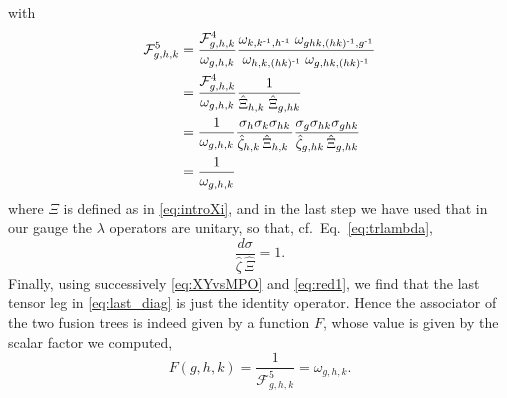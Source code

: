 \documentclass[reprint,
superscriptaddress,
amsmath,amssymb,
notitlepage,
aps,
prb,
10pt, 
tightenlines
]{revtex4-2}
\begin{document}
with
\begin{align}
    \mathcal{F}^5_{g,h,k}&=\frac{\mathcal{F}^4_{g,h,k}}{\omega_{g,h,k}}\frac{\omega_{k,k^{\text{-}1},h^{\text{-}1}}\;\omega_{ghk,(hk)^{\text{-}1},g^{\text{-}1}}}{\omega_{h,k,(hk)^{\text{-}1}}\;\omega_{g,hk,(hk)^{\text{-}1}}}\nonumber\\
    &=\frac{\mathcal{F}^4_{g,h,k}}{\omega_{g,h,k}}\dfrac{1}{\hat\Xi_{h,k}\;\hat\Xi_{g, hk}}\nonumber\\
    &=\frac{1}{\omega_{g,h,k}}\dfrac{\sigma_h\sigma_k\sigma_{hk}}{\hat\zeta_{h,k}\,\hat\Xi_{h,k}\;}\dfrac{\sigma_g\sigma_{hk}\sigma_{ghk}}{\hat\zeta_{g,hk}\,\hat\Xi_{g, hk}}\nonumber\\
    &=\frac{1}{\omega_{g,h,k}}
\end{align}
where $\Xi$ is defined as in \eqref{eq:introXi}, and in the last step we have used that in our gauge the $\lambda$ operators are unitary, so that, cf.~Eq.~\eqref{eq:trlambda},
\begin{equation}
    \dfrac{d\sigma}{\hat\zeta\,\hat\Xi}=1.
\end{equation}
Finally, using successively \eqref{eq:XYvsMPO} and \eqref{eq:red1}, we find that the last tensor leg in \eqref{eq:last_diag} is just the identity operator. Hence the associator of the two fusion trees is indeed given by a function $F$, whose value is given by the scalar factor we computed,
\begin{equation}
F(g,h,k) = \dfrac{1}{\mathcal{F}^5_{g,h,k}}=\omega_{g,h,k}.
\end{equation}
\end{document}
